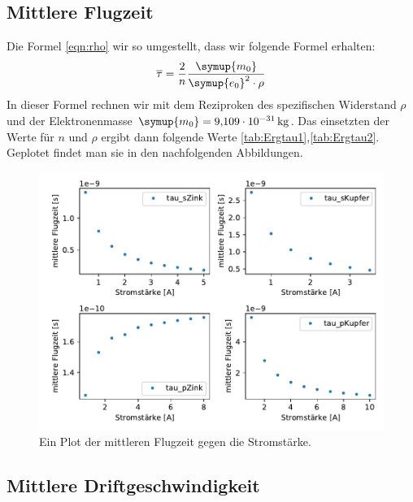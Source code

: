     \subsection{Mittlere Flugzeit}

    
    Die Formel \ref{eqn:rho} wir so umgestellt, dass wir folgende Formel erhalten:
    \begin{equation}
        \overline{\tau} =\frac{2}{n}\frac{\symup{m_0}}{\symup{e_0}^2 \cdot \rho} \nonumber
    \end{equation}
    In dieser Formel rechnen wir mit dem Reziproken des spezifischen Widerstand $\rho$ und der Elektronenmasse
    $\symup{m_0} = \SI{9.109e-31}{\kilogram}$. Das einsetzten der Werte für $n$ und $\rho$ ergibt dann folgende Werte \ref{tab:Ergtau1},\ref{tab:Ergtau2}.
    Geplotet findet man sie in den nachfolgenden Abbildungen.

    \begin{figure}[H]
        \centering
        \includegraphics[width=1.1\textwidth]{build/tau.pdf}
        \caption{Ein Plot der mittleren Flugzeit gegen die Stromstärke.}
        \label{img:tau}
    \end{figure}


    \subsection{Mittlere Driftgeschwindigkeit}


